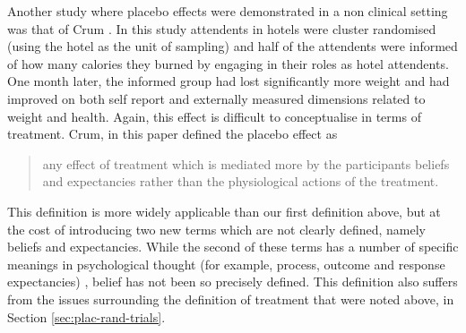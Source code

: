 


Another study where placebo effects were demonstrated in a non clinical setting was that of Crum \cite{Crum2007}. In this study attendents in hotels were cluster randomised (using the hotel as the unit of sampling) and half of the attendents were informed of how many calories they burned by engaging in their roles as hotel attendents. One month later, the informed group had lost significantly more weight and had improved on both self report and externally measured dimensions related to weight and health. Again, this effect is difficult to conceptualise in terms of treatment.  Crum, in this paper defined the placebo effect as

\begin{quotation}
  any effect of treatment which is mediated more by the participants
  beliefs and expectancies rather than the physiological actions of
  the treatment.
\end{quotation}

This definition is more widely applicable than our first definition above, but at the cost of introducing two new terms which are not clearly defined, namely beliefs and expectancies. While the second of these terms has a number of specific meanings in psychological thought (for example, process, outcome and response expectancies) \cite{Bandura1977,Kirsch1985}, belief has not been so precisely defined. This definition also suffers from the issues surrounding the definition of treatment that were noted above, in Section \ref{sec:plac-rand-trials}. 




